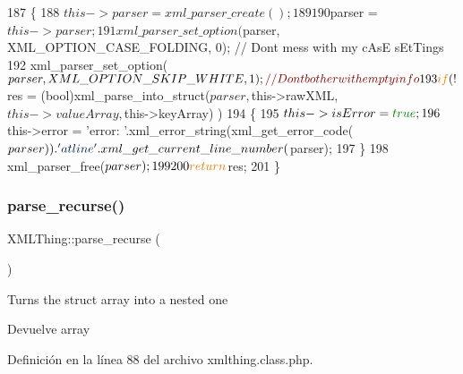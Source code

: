 \begin{DoxyCode}
187         \{
188         $this->parser = xml\_parser\_create();
189 
190         $parser = $this->parser;
191         xml\_parser\_set\_option($parser, XML\_OPTION\_CASE\_FOLDING, 0);     \textcolor{comment}{// Dont mess with my cAsE sEtTings}
192         xml\_parser\_set\_option($parser, XML\_OPTION\_SKIP\_WHITE, 1);               \textcolor{comment}{// Dont bother with empty
       info}
193         \textcolor{keywordflow}{if} (!$res = (\textcolor{keywordtype}{bool})xml\_parse\_into\_struct($parser, $this->rawXML, $this->valueArray, $this->keyArray)
      )
194                 \{
195                         $this->isError = \textcolor{keyword}{true};
196             $this->error = \textcolor{stringliteral}{'error: '}.xml\_error\_string(xml\_get\_error\_code($parser)).\textcolor{stringliteral}{' at line '}.
      xml\_get\_current\_line\_number($parser);
197         \}
198         xml\_parser\_free($parser);
199 
200                 \textcolor{keywordflow}{return} $res;
201         \}
\end{DoxyCode}
\mbox{\label{classXMLThing_ae18a74c5d5979c699b42b1f9a8fedbba}} 
\subsubsection{\texorpdfstring{parse\+\_\+recurse()}{parse\_recurse()}}
{\footnotesize\ttfamily X\+M\+L\+Thing\+::parse\+\_\+recurse (\begin{DoxyParamCaption}{ }\end{DoxyParamCaption})}

Turns the struct array into a nested one \begin{DoxyReturn}{Devuelve}
array 
\end{DoxyReturn}


Definición en la línea 88 del archivo xmlthing.\+class.\+php.


